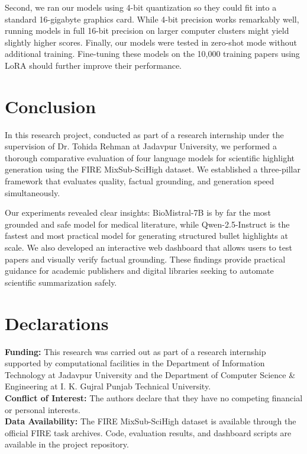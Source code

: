 \documentclass[11pt,a4paper]{article}
\begin{document}
Second, we ran our models using 4-bit quantization so they could fit into a standard 16-gigabyte graphics card. While 4-bit precision works remarkably well, running models in full 16-bit precision on larger computer clusters might yield slightly higher scores. Finally, our models were tested in zero-shot mode without additional training. Fine-tuning these models on the 10,000 training papers using LoRA \cite{hu2022lora} should further improve their performance.

\section{Conclusion}
\label{sec:conclusion}
In this research project, conducted as part of a research internship under the supervision of Dr. Tohida Rehman at Jadavpur University, we performed a thorough comparative evaluation of four language models for scientific highlight generation using the FIRE MixSub-SciHigh dataset. We established a three-pillar framework that evaluates quality, factual grounding, and generation speed simultaneously.

Our experiments revealed clear insights: BioMistral-7B is by far the most grounded and safe model for medical literature, while Qwen-2.5-Instruct is the fastest and most practical model for generating structured bullet highlights at scale. We also developed an interactive web dashboard that allows users to test papers and visually verify factual grounding. These findings provide practical guidance for academic publishers and digital libraries seeking to automate scientific summarization safely.

\section*{Declarations}
\small
\textbf{Funding:} This research was carried out as part of a research internship supported by computational facilities in the Department of Information Technology at Jadavpur University and the Department of Computer Science \& Engineering at I. K. Gujral Punjab Technical University.\\
\textbf{Conflict of Interest:} The authors declare that they have no competing financial or personal interests.\\
\textbf{Data Availability:} The FIRE MixSub-SciHigh dataset is available through the official FIRE task archives. Code, evaluation results, and dashboard scripts are available in the project repository.
\end{document}
